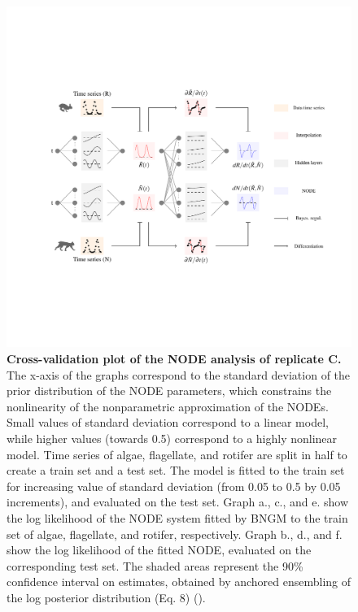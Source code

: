 \documentclass[11pt, oneside]{article}
\begin{document}
\newpage
\begin{figure}[H]
\includegraphics[width=1\linewidth,page=21]{figures/main.pdf}
\caption{
    \textbf{Cross-validation plot of the NODE analysis of replicate C.}
    The x-axis of the graphs correspond to the standard deviation of the prior distribution of the NODE parameters, which constrains the nonlinearity of the nonparametric approximation of the NODEs.
    Small values of standard deviation correspond to a linear model, while higher values (towards 0.5) correspond to a highly nonlinear model.
    Time series of algae, flagellate, and rotifer are split in half to create a train set and a test set. 
    The model is fitted to the train set for increasing value of standard deviation (from 0.05 to 0.5 by 0.05 increments), and evaluated on the test set.
    Graph a., c., and e. show the log likelihood of the NODE system fitted by BNGM to the train set of algae, flagellate, and rotifer, respectively.
    Graph b., d., and f. show the log likelihood of the fitted NODE, evaluated on the corresponding test set.
    The shaded areas represent the 90\% confidence interval on estimates, obtained by anchored ensembling of the log posterior distribution (Eq. 8) (\cite{Pearce2018}).
}
\end{figure}
\newpage
\end{document}
